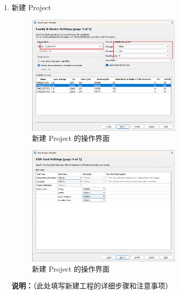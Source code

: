 \documentclass[UTF8]{article}
\theoremstyle{MyLineTheoremStyle} %
\theoremstyle{MyBlockTheoremStyle} %
\theoremstyle{MySubsubsectionStyle} %
\begin{document}
\begin{enumerate}
    \item 新建 Project
    \begin{figure}[H]
        \centering
        \includegraphics[width=0.7\textwidth]{step1.png}
        \caption{新建 Project 的操作界面}
        \label{fig:step1}
    \end{figure}
    \begin{figure}[H]
        \centering
        \includegraphics[width=0.7\textwidth]{step1_2.png}
        \caption{新建 Project 的操作界面}
        \label{fig:step1_2}
    \end{figure}
    \textbf{说明：}（此处填写新建工程的详细步骤和注意事项）


\end{enumerate}
\end{document}
